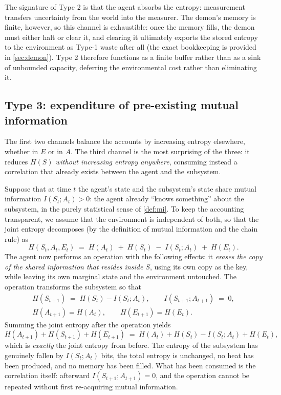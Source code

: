 \documentclass[11pt]{article}
\begin{document}
The signature of Type 2 is that the agent absorbs the entropy: measurement transfers uncertainty from the world into the measurer. The demon's memory is finite, however, so this channel is exhaustible: once the memory fills, the demon must either halt or clear it, and clearing it ultimately exports the stored entropy to the environment as Type-1 waste after all (the exact bookkeeping is provided in \cref{sec:demon}). Type 2 therefore functions as a finite buffer rather than as a sink of unbounded capacity, deferring the environmental cost rather than eliminating it.

\subsection{Type 3: expenditure of pre-existing mutual information}
\label{sec:type3}

The first two channels balance the accounts by increasing entropy elsewhere, whether in $E$ or in $A$. The third channel is the most surprising of the three: it reduces $H(S)$ \emph{without increasing entropy anywhere}, consuming instead a correlation that already exists between the agent and the subsystem.

Suppose that at time $t$ the agent's state and the subsystem's state share mutual information $I(S_t; A_t) > 0$: the agent already ``knows something'' about the subsystem, in the purely statistical sense of \cref{def:mi}. To keep the accounting transparent, we assume that the environment is independent of both, so that the joint entropy decomposes (by the definition of mutual information and the chain rule) as
\[
H(S_t, A_t, E_t) \;=\; H(A_t) \;+\; H(S_t) \;-\; I(S_t; A_t) \;+\; H(E_t).
\]
The agent now performs an operation with the following effects: it \emph{erases the copy of the shared information that resides inside $S$}, using its own copy as the key, while leaving its own marginal state and the environment untouched. The operation transforms the subsystem so that
\begin{gather*}
H(S_{t+1}) \;=\; H(S_t) - I(S_t; A_t), \qquad I(S_{t+1}; A_{t+1}) \;=\; 0,\\
H(A_{t+1}) = H(A_t), \qquad H(E_{t+1}) = H(E_t).
\end{gather*}
Summing the joint entropy after the operation yields
\[
H(A_{t+1}) + H(S_{t+1}) + H(E_{t+1}) \;=\; H(A_t) + H(S_t) - I(S_t;A_t) + H(E_t),
\]
which is \emph{exactly} the joint entropy from before. The entropy of the subsystem has genuinely fallen by $I(S_t; A_t)$ bits, the total entropy is unchanged, no heat has been produced, and no memory has been filled. What has been consumed is the correlation itself: afterward $I(S_{t+1}; A_{t+1}) = 0$, and the operation cannot be repeated without first re-acquiring mutual information.
\end{document}
